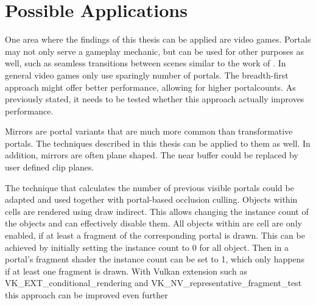 \section{Possible Applications}
One area where the findings of this thesis can be applied are video games. Portals may not only serve a gameplay mechanic, but can be used for other purposes as well, such as seamless transitions between scenes similar to the work of \textcite{schmalstieg:1999:sewing}. In general video games only use sparingly number of portals. The breadth-first approach might offer better performance, allowing for higher \glspl{portalcount}. As previously stated, it needs to be tested whether this approach actually improves performance.

Mirrors are portal variants that are much more common than transformative portals. The techniques described in this thesis can be applied to them as well. In addition, mirrors are often plane shaped. The near buffer could be replaced by user defined clip planes.


The technique that calculates the number of previous visible portals could be adapted and used together with portal-based occlusion culling. Objects within cells are rendered using draw indirect. This allows changing the instance count of the objects and can effectively disable them. All objects within are cell are only enabled, if at least a fragment of the corresponding portal is drawn. This can be achieved by initially setting the instance count to 0 for all object. Then in a portal's fragment shader the instance count can be set to 1, which only happens if at least one fragment is drawn. With Vulkan extension such as VK\_EXT\_conditional\_rendering and VK\_NV\_representative\_fragment\_test this approach can be improved even further \cite{khronos:vulkan:spec1.1}




